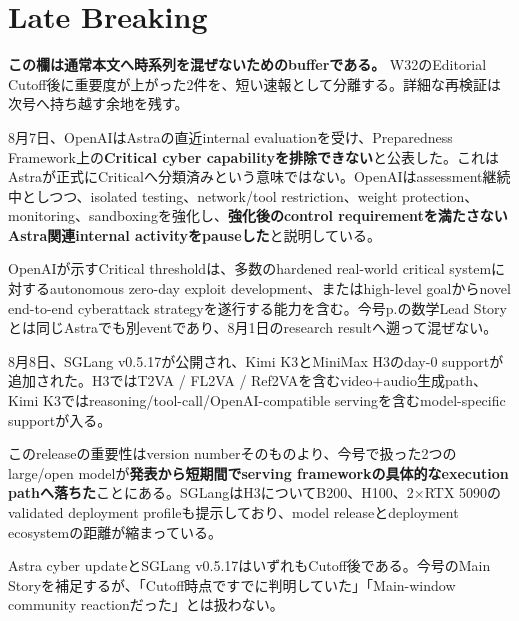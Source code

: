 \section{Late Breaking}

\textbf{この欄は通常本文へ時系列を混ぜないためのbufferである。} W32のEditorial Cutoff後に重要度が上がった2件を、短い速報として分離する。詳細な再検証は次号へ持ち越す余地を残す。

\begin{latebreaking}
8月7日、OpenAIはAstraの直近internal evaluationを受け、Preparedness Framework上の\textbf{Critical cyber capabilityを排除できない}と公表した\cite{openai-astra-critical-cyber}。これはAstraが正式にCriticalへ分類済みという意味ではない。OpenAIはassessment継続中としつつ、isolated testing、network/tool restriction、weight protection、monitoring、sandboxingを強化し、\textbf{強化後のcontrol requirementを満たさないAstra関連internal activityをpauseした}と説明している。

OpenAIが示すCritical thresholdは、多数のhardened real-world critical systemに対するautonomous zero-day exploit development、またはhigh-level goalからnovel end-to-end cyberattack strategyを遂行する能力を含む\cite{openai-astra-critical-cyber}。今号p.\pageref{sec:astra-lead}の数学Lead Storyとは同じAstraでも別eventであり、8月1日のresearch resultへ遡って混ぜない。
\end{latebreaking}

\begin{latebreaking}
8月8日、SGLang v0.5.17が公開され、Kimi K3とMiniMax H3のday-0 supportが追加された\cite{sglang-0517}。H3ではT2VA / FL2VA / Ref2VAを含むvideo+audio生成path、Kimi K3ではreasoning/tool-call/OpenAI-compatible servingを含むmodel-specific supportが入る。

このreleaseの重要性はversion numberそのものより、今号で扱った2つのlarge/open modelが\textbf{発表から短期間でserving frameworkの具体的なexecution pathへ落ちた}ことにある。SGLangはH3についてB200、H100、2×RTX 5090のvalidated deployment profileも提示しており、model releaseとdeployment ecosystemの距離が縮まっている。
\end{latebreaking}

\begin{claimboundary}
Astra cyber updateとSGLang v0.5.17はいずれもCutoff後である。今号のMain Storyを補足するが、「Cutoff時点ですでに判明していた」「Main-window community reactionだった」とは扱わない。
\end{claimboundary}
